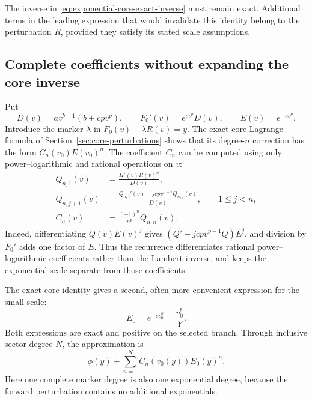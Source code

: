 The inverse in \eqref{eq:exponential-core-exact-inverse} must remain
exact. Additional terms in the leading expression that would invalidate
this identity belong to the perturbation $R$, provided they satisfy its
stated scale assumptions.

\subsection{Complete coefficients without expanding the core inverse}

Put
\begin{equation}
 D(v)=a v^{b-1}(b+cpv^p),\qquad
 F_0'(v)=e^{cv^p}D(v),\qquad E(v)=e^{-cv^p}.
 \label{eq:exponential-core-derivative}
\end{equation}
Introduce the marker $\lambda$ in $F_0(v)+\lambda R(v)=y$.
The exact-core Lagrange formula of Section~\ref{sec:core-perturbations}
shows that its degree-$n$ correction has the form
$C_n(v_0)E(v_0)^n$. The coefficient $C_n$ can be computed using only
power--logarithmic and rational operations on $v$:
\begin{align}
 Q_{n,1}(v)&=\frac{H'(v)R(v)^n}{D(v)},
 \label{eq:exponential-core-coefficient-initial}\\
 Q_{n,j+1}(v)&=
 \frac{Q_{n,j}'(v)-jcpv^{p-1}Q_{n,j}(v)}{D(v)},
 \qquad 1\le j<n,\label{eq:exponential-core-coefficient-recursion}\\
 C_n(v)&=\frac{(-1)^n}{n!}Q_{n,n}(v).
 \label{eq:exponential-core-coefficient-final}
\end{align}
Indeed, differentiating $Q(v)E(v)^j$ gives
$(Q'-jcpv^{p-1}Q)E^j$, and division by $F_0'$ adds one factor of $E$.
Thus the recurrence differentiates rational power--logarithmic
coefficients rather than the Lambert inverse, and keeps the exponential
scale separate from those coefficients.

The exact core identity gives a second, often more convenient expression
for the small scale:
\begin{equation}
 E_0=e^{-cv_0^p}=\frac{v_0^b}{Y}.
 \label{eq:exponential-core-target-sector}
\end{equation}
Both expressions are exact and positive on the selected branch. Through inclusive
sector degree $N$, the approximation is
\begin{equation}
 \phi(y)+\sum_{n=1}^N C_n(v_0(y))E_0(y)^n.
 \label{eq:exponential-core-retained-sectors}
\end{equation}
Here one complete marker degree is also one exponential degree, because
the forward perturbation contains no additional exponentials.

